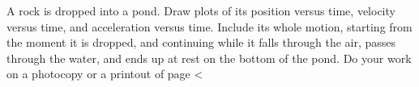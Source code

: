  A rock is dropped into a pond. Draw plots of its position
versus time, velocity versus time, and acceleration versus
time. Include its whole motion, starting from the moment it
is dropped, and continuing while it falls through the air,
passes through the water, and ends up at rest on the bottom of the pond.
Do your work on a photocopy or a printout of 
page <%
